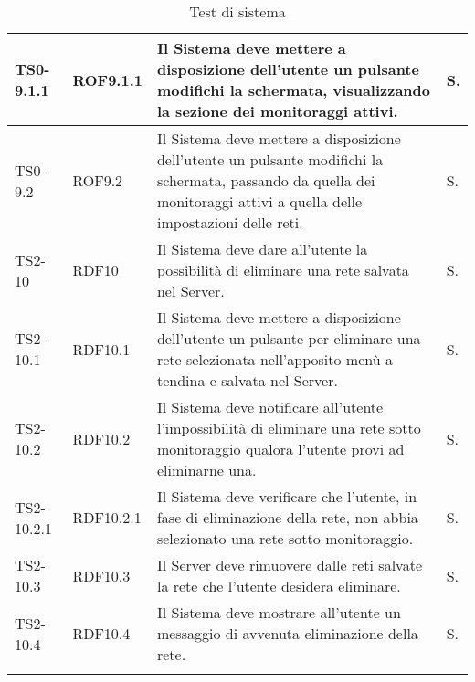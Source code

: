 \begin{longtable}{|C{.15\textwidth}|C{.14\textwidth}|m{.52\textwidth}|m{.08\textwidth}|}
\hline
TS0-9.1.1 & ROF9.1.1 & Il Sistema deve mettere a disposizione dell'utente un pulsante modifichi la schermata, visualizzando la sezione dei monitoraggi attivi. & S. \\
\hline
{}TS0-9.2 & ROF9.2 & Il Sistema deve mettere a disposizione dell'utente un pulsante modifichi la schermata, passando da quella dei monitoraggi attivi a quella delle impostazioni delle reti. & S. \\
\hline
TS2-10 & RDF10 & Il Sistema deve dare all'utente la possibilità di eliminare una rete salvata nel Server. & S. \\
\hline
{}TS2-10.1 & RDF10.1 & Il Sistema deve mettere a disposizione dell'utente un pulsante per eliminare una rete selezionata nell'apposito menù a tendina e salvata nel Server. & S. \\
\hline
TS2-10.2 & RDF10.2 & Il Sistema deve notificare all'utente l'impossibilità di eliminare una rete sotto monitoraggio qualora l'utente provi ad eliminarne una. & S. \\
\hline
{}TS2-10.2.1 & RDF10.2.1 & Il Sistema deve verificare che l'utente, in fase di eliminazione della rete, non abbia selezionato una rete sotto monitoraggio. & S. \\
\hline
TS2-10.3 & RDF10.3 & Il Server deve rimuovere dalle reti salvate la rete che l'utente desidera eliminare. & S. \\
\hline

TS2-10.4 & RDF10.4 & Il Sistema deve mostrare all'utente un messaggio di avvenuta eliminazione della rete. & S. \\
\hline

\caption{Test di sistema}
\label{testdisistema}
\end{longtable}